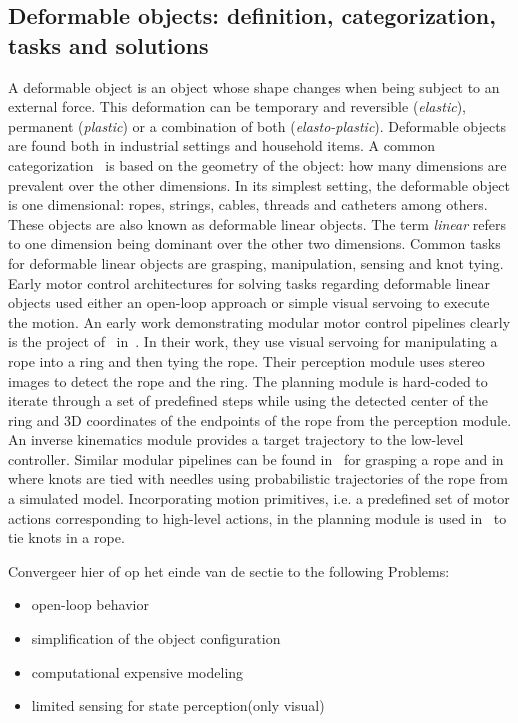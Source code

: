 \documentclass[\home/main.tex]{subfiles}
\begin{document}
\subsection{Deformable objects: definition, categorization, tasks and solutions}
A deformable object is an object whose shape changes when being subject to an external force. This deformation can be temporary and reversible (\textit{elastic}), permanent (\textit{plastic}) or a combination of both (\textit{elasto-plastic}). Deformable objects are found both in industrial settings and household items. A common categorization~\autocite{Saadat2002,Jimenez2012} is based on the geometry of the object: how many dimensions are prevalent over the other dimensions. In its simplest setting, the deformable object is one dimensional: ropes, strings, cables, threads and catheters among others. These objects are also known as deformable linear objects. The term \textit{linear} refers to one dimension being dominant over the other two dimensions. Common tasks for deformable linear objects are grasping, manipulation, sensing and knot tying. Early motor control architectures for solving tasks regarding deformable linear objects used either an open-loop approach or simple visual servoing to execute the motion. An early work demonstrating modular motor control pipelines clearly is the project of~\citeauthor{Inaba1987} in~\citeyear{Inaba1987}. In their work, they use visual servoing for manipulating a rope into a ring and then tying the rope. Their perception module uses stereo images to detect the rope and the ring. The planning module is hard-coded to iterate through a set of predefined steps while using the detected center of the ring and 3D coordinates of the endpoints of the rope from the perception module. An inverse kinematics module provides a target trajectory to the low-level controller. Similar modular pipelines can be found in~\autocite{Remde1999} for grasping a rope and in~\autocite{Saha2007} where knots are tied with needles using probabilistic trajectories of the rope from a simulated model. Incorporating motion primitives, i.e. a predefined set of motor actions corresponding to high-level actions, in the planning module is used in~\autocite{Yamakawa2008, Vinh2012} to tie knots in a rope.

Convergeer hier of op het einde van de sectie to the following Problems:
\begin{itemize}
    \item  open-loop behavior
    \item  simplification of the object configuration
    \item  computational expensive modeling
    \item  limited sensing for state perception(only visual)
\end{itemize}
\end{document}
